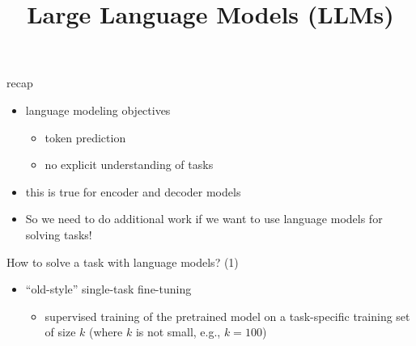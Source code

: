 



\newcommand{\learninggoals}{
\item comprehend the different subtleties in the space of fine-tuning and prompting}

\def\myblue#1{\textcolor{texblue}{#1}}

\title{Large Language Models (LLMs)}
\date{}






\begin{frame}{recap}

\vfill

\begin{itemize}
    \item language modeling objectives
        \begin{itemize}
            \item token prediction
            \item no explicit understanding of tasks
        \end{itemize}
    \item this is true for encoder and decoder models
    \item So we need to do additional work if we want
        to use language models for solving tasks!
\end{itemize}

\vfill

\end{frame}


\begin{frame}{How to solve a task with language models? (1)}

\vfill

\begin{itemize}
    \item ``old-style'' single-task fine-tuning 
        \begin{itemize}
            \item supervised training
of the pretrained model
on a task-specific
        training set of size $k$ (where $k$ is not small,
        e.g., $k=100$)
        \end{itemize}
\end{itemize}

\vfill

\end{frame}

